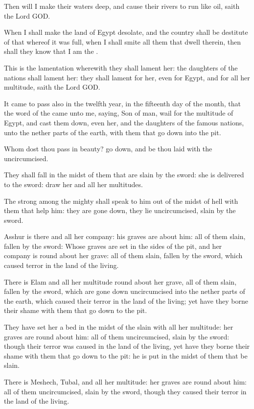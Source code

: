 \verse Then will I make their waters deep, and cause their rivers to run like oil, saith the Lord GOD.

\verse When I shall make the land of Egypt desolate, and the country shall be destitute of that whereof it was full, when I shall smite all them that dwell therein, then shall they know that I am the \LORD.

\verse This is the lamentation wherewith they shall lament her: the daughters of the nations shall lament her: they shall lament for her, even for Egypt, and for all her multitude, saith the Lord GOD.

\verse It came to pass also in the twelfth year, in the fifteenth day of the month, that the word of the \LORD came unto me, saying, \verse Son of man, wail for the multitude of Egypt, and cast them down, even her, and the daughters of the famous nations, unto the nether parts of the earth, with them that go down into the pit.

\verse Whom dost thou pass in beauty? go down, and be thou laid with the uncircumcised.

\verse They shall fall in the midst of them that are slain by the sword: she is delivered to the sword: draw her and all her multitudes.

\verse The strong among the mighty shall speak to him out of the midst of hell with them that help him: they are gone down, they lie uncircumcised, slain by the sword.

\verse Asshur is there and all her company: his graves are about him: all of them slain, fallen by the sword: \verse Whose graves are set in the sides of the pit, and her company is round about her grave: all of them slain, fallen by the sword, which caused terror in the land of the living.

\verse There is Elam and all her multitude round about her grave, all of them slain, fallen by the sword, which are gone down uncircumcised into the nether parts of the earth, which caused their terror in the land of the living; yet have they borne their shame with them that go down to the pit.

\verse They have set her a bed in the midst of the slain with all her multitude: her graves are round about him: all of them uncircumcised, slain by the sword: though their terror was caused in the land of the living, yet have they borne their shame with them that go down to the pit: he is put in the midst of them that be slain.

\verse There is Meshech, Tubal, and all her multitude: her graves are round about him: all of them uncircumcised, slain by the sword, though they caused their terror in the land of the living.

